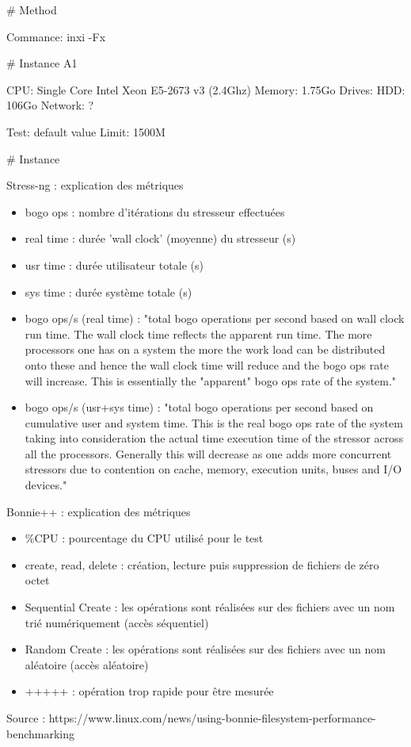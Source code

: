 # Method

Commance: inxi -Fx

# Instance A1

CPU: Single Core Intel Xeon E5-2673 v3 (2.4Ghz)
Memory: 1.75Go
Drives: HDD: 106Go
Network: ?


Test: default value
Limit: 1500M


# Instance 

Stress-ng : explication des métriques
\begin{itemize}
  \item bogo ops : nombre d'itérations du stresseur effectuées
  \item real time : durée 'wall clock' (moyenne) du stresseur (s)
  \item usr time : durée utilisateur totale (s)
  \item sys time : durée système totale (s)
  \item bogo ops/s (real time) : "total bogo operations per second based on wall clock run time. The wall clock time reflects the apparent run time. The more processors one has on a system the more the work load can be distributed onto these and hence the wall clock time will reduce and the bogo ops rate will increase. This is essentially the "apparent" bogo ops rate of the system."
  \item bogo ops/s (usr+sys time) : "total bogo operations per second based on cumulative user and system time. This is the real bogo ops rate of the system taking into consideration the actual time execution time of the stressor across all the processors. Generally this will decrease as one adds more concurrent stressors due to contention on cache, memory, execution units, buses and I/O devices."
\end{itemize}

Bonnie++ : explication des métriques
\begin{itemize}
  \item \%CPU : pourcentage du CPU utilisé pour le test
  \item create, read, delete : création, lecture puis suppression de fichiers de zéro octet
  \item Sequential Create : les opérations sont réalisées sur des fichiers avec un nom trié numériquement (accès séquentiel)
  \item Random Create : les opérations sont réalisées sur des fichiers avec un nom aléatoire (accès aléatoire)
  \item +++++ : opération trop rapide pour être mesurée
\end{itemize}

Source : https://www.linux.com/news/using-bonnie-filesystem-performance-benchmarking
